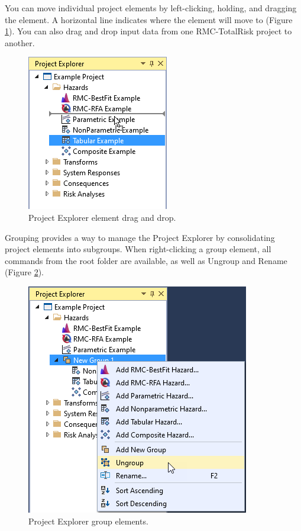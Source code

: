\documentclass[
]{book}
\begin{document}
You can move individual project elements by left-clicking, holding, and dragging the element. A horizontal line indicates where the element will move to (Figure \ref{fig:figure-27}). You can also drag and drop input data from one RMC-TotalRisk project to another.

\begin{figure}

{\centering \includegraphics{images/figure27} 

}

\caption{Project Explorer element drag and drop.}\label{fig:figure-27}
\end{figure}

Grouping provides a way to manage the Project Explorer by consolidating project elements into subgroups. When right-clicking a group element, all commands from the root folder are available, as well as Ungroup and Rename (Figure \ref{fig:figure-28}).

\begin{figure}

{\centering \includegraphics{images/figure28} 

}

\caption{Project Explorer group elements.}\label{fig:figure-28}
\end{figure}
\end{document}
